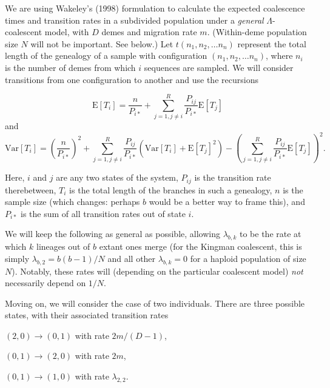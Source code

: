 \documentclass[rmp]{revtex4}
\begin{document}
We are using Wakeley's (1998) formulation to calculate the expected coalescence times and transition rates in a subdivided population under a \emph{general} $\Lambda$-coalescent model, with $D$ demes and migration rate $m$.
(Within-deme population size $N$ will not be important. See below.)
Let $t(n_1,n_2,\ldots n_n)$ represent the total length of the genealogy of a sample with configuration $(n_1,n_2,\ldots n_n)$, where $n_i$ is the number of demes from which $i$ sequences are sampled.
We will consider transitions from one configuration to another and use the recursions

\begin{equation}
\mathrm{E} \left[ T_i \right] = \frac{n}{P_{i*}} + \sum_{j=1,j \neq i}^R \frac{P_{ij}}{P_{i*}} \mathrm{E} \left[ T_j \right]
\end{equation}
and
\begin{equation}
\mathrm{Var} \left[ T_i \right] = \left( \frac{n}{P_{i*}} \right)^2 + \sum_{j=1,j \neq i}^R \frac{P_{ij}}{P_{i*}} (\mathrm{Var} \left[ T_i \right] + \mathrm{E} \left[ T_j \right]^2) - \left( \sum_{j=1,j \neq i}^R \frac{P_{ij}}{P_{i*}} \mathrm{E} \left[ T_j \right] \right)^2.
\end{equation}

Here, $i$ and $j$ are any two states of the system, $P_{ij}$ is the transition rate therebetween, $T_i$ is the total length of the branches in such a genealogy, $n$ is the sample size (which changes: perhaps $b$ would be a better way to frame this), and $P_{i*}$ is the sum of all transition rates out of state $i$.

We will keep the following as general as possible, allowing $\lambda_{b,k}$ to be the rate at which $k$ lineages out of $b$ extant ones merge (for the Kingman coalescent, this is simply $\lambda_{b,2} = b(b-1)/N$ and all other $\lambda_{b,k} = 0$ for a haploid population of size $N$).
Notably, these rates will (depending on the particular coalescent model) \emph{not} necessarily depend on $1/N$.

Moving on, we will consider the case of two individuals.
There are three possible states, with their associated transition rates

$(2,0) \to (0,1)$ with rate $2m/(D-1)$,

$(0,1) \to (2,0)$ with rate $2m$,

$(0,1) \to (1,0)$ with rate $\lambda_{2,2}$.
\end{document}
